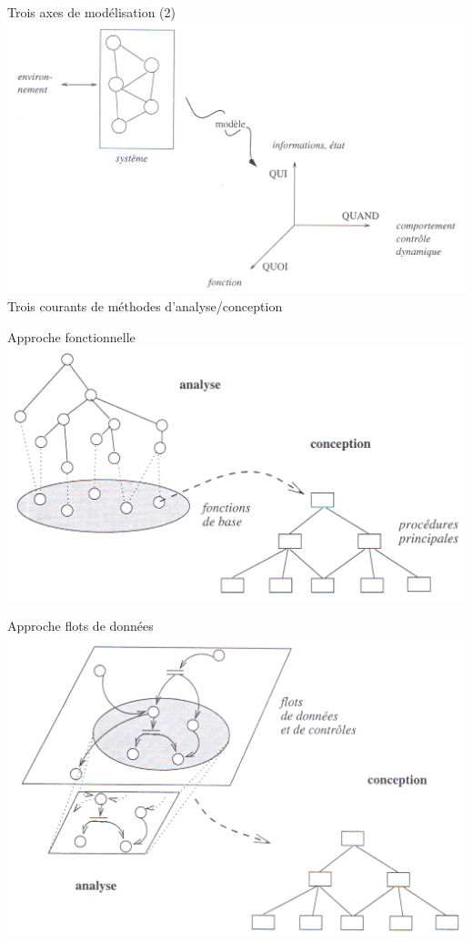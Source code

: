 \documentclass[14pt]{beamer}
\begin{document}
\begin{framentitle}{Trois axes de modélisation (2)}
    \includegraphics[width=\textwidth]{fig2.png}
    \rae Trois courants de méthodes d'analyse/conception
\end{framentitle}


\begin{framentitle}{Approche fonctionnelle}
    \includegraphics[width=\textwidth]{fig1b.png}
\end{framentitle}

\begin{framentitle}{Approche flots de données}
    \includegraphics[width=\textwidth]{fig3a.png}
\end{framentitle}
\end{document}
